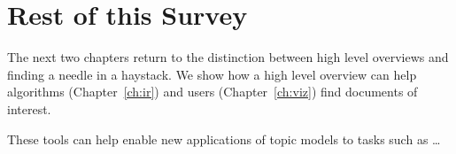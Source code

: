 \section{Rest of this Survey}

The next two chapters return to the distinction between high level overviews and
finding a needle in a haystack.  We show how a high level overview can help
algorithms (Chapter~\ref{ch:ir}) and users (Chapter~\ref{ch:viz}) find documents
of interest.

These tools can help enable new applications of topic models to tasks such as
\dots

